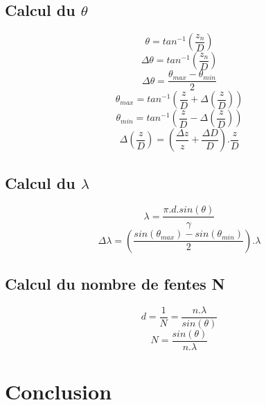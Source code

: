 \documentclass[11pt,a4paper]{report}
\begin{document}
	\subsection{Calcul du $\theta$}
	\begin{equation}
	\theta = tan^{-1}\left(\frac{z_{n}}{D}\right) 
	\end{equation}
	\begin{equation}
	\Delta \theta = tan^{-1}\left(\frac{z_{n}}{D}\right) 
	\end{equation}
	\begin{equation}
\Delta\theta=\frac{\theta_{max}-\theta_{min}}{2}
	\end{equation}
	\begin{equation}
	\theta_{max} = tan^{-1}\left(\frac{z}{D}+\Delta\left(\frac{z}{D}\right)\right)
	\end{equation}
	\begin{equation}
	\theta_{min} = tan^{-1}\left(\frac{z}{D}-\Delta\left(\frac{z}{D}\right)\right)
	\end{equation}
	\begin{equation}
	\Delta\left(\frac{z}{D}\right)=\left(\frac{\Delta z}{z}+\frac{\Delta D}{D}\right).\frac{z}{D}
	\end{equation}
	\subsection{Calcul du $\lambda$}
	\begin{equation}
	\lambda = \frac{\pi.d.sin(\theta)}{\gamma}
	\end{equation}
	\begin{equation}
	\Delta \lambda = \left(\frac{sin(\theta_{max})-sin(\theta_{min})}{2}\right) . \lambda
	\end{equation}
	\subsection{Calcul du nombre de fentes N}
	\begin{equation}
	d = \frac{1}{N} = \frac{n.\lambda}{sin(\theta)}
	\end{equation}
	\begin{equation}
	N =  \frac{sin(\theta)}{n.\lambda}
	\end{equation}

	\section{Conclusion}
\end{document}
